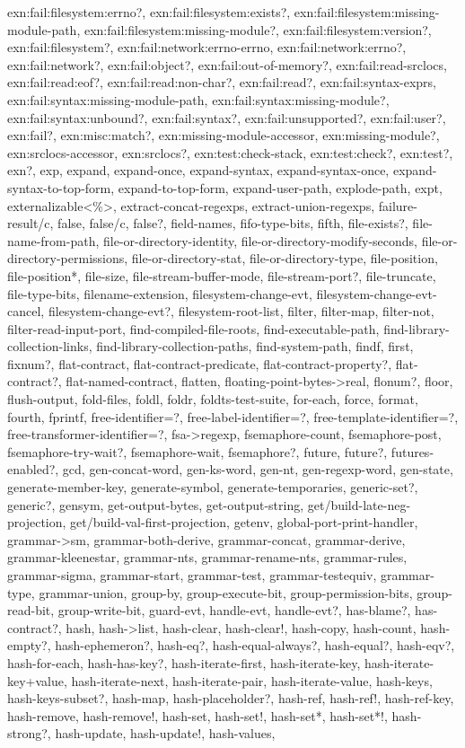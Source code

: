 {{exn:fail:filesystem:errno?, exn:fail:filesystem:exists?, exn:fail:filesystem:missing-module-path, exn:fail:filesystem:missing-module?, exn:fail:filesystem:version?, exn:fail:filesystem?, exn:fail:network:errno-errno, exn:fail:network:errno?, exn:fail:network?, exn:fail:object?, exn:fail:out-of-memory?, exn:fail:read-srclocs, exn:fail:read:eof?, exn:fail:read:non-char?, exn:fail:read?, exn:fail:syntax-exprs, exn:fail:syntax:missing-module-path, exn:fail:syntax:missing-module?, exn:fail:syntax:unbound?, exn:fail:syntax?, exn:fail:unsupported?, exn:fail:user?, exn:fail?, exn:misc:match?, exn:missing-module-accessor, exn:missing-module?, exn:srclocs-accessor, exn:srclocs?, exn:test:check-stack, exn:test:check?, exn:test?, exn?, exp, expand, expand-once, expand-syntax, expand-syntax-once, expand-syntax-to-top-form, expand-to-top-form, expand-user-path, explode-path, expt, externalizable<\%>, extract-concat-regexps, extract-union-regexps, failure-result/c, false, false/c, false?, field-names, fifo-type-bits, fifth, file-exists?, file-name-from-path, file-or-directory-identity, file-or-directory-modify-seconds, file-or-directory-permissions, file-or-directory-stat, file-or-directory-type, file-position, file-position*, file-size, file-stream-buffer-mode, file-stream-port?, file-truncate, file-type-bits, filename-extension, filesystem-change-evt, filesystem-change-evt-cancel, filesystem-change-evt?, filesystem-root-list, filter, filter-map, filter-not, filter-read-input-port, find-compiled-file-roots, find-executable-path, find-library-collection-links, find-library-collection-paths, find-system-path, findf, first, fixnum?, flat-contract, flat-contract-predicate, flat-contract-property?, flat-contract?, flat-named-contract, flatten, floating-point-bytes->real, flonum?, floor, flush-output, fold-files, foldl, foldr, foldts-test-suite, for-each, force, format, fourth, fprintf, free-identifier=?, free-label-identifier=?, free-template-identifier=?, free-transformer-identifier=?, fsa->regexp, fsemaphore-count, fsemaphore-post, fsemaphore-try-wait?, fsemaphore-wait, fsemaphore?, future, future?, futures-enabled?, gcd, gen-concat-word, gen-ks-word, gen-nt, gen-regexp-word, gen-state, generate-member-key, generate-symbol, generate-temporaries, generic-set?, generic?, gensym, get-output-bytes, get-output-string, get/build-late-neg-projection, get/build-val-first-projection, getenv, global-port-print-handler, grammar->sm, grammar-both-derive, grammar-concat, grammar-derive, grammar-kleenestar, grammar-nts, grammar-rename-nts, grammar-rules, grammar-sigma, grammar-start, grammar-test, grammar-testequiv, grammar-type, grammar-union, group-by, group-execute-bit, group-permission-bits, group-read-bit, group-write-bit, guard-evt, handle-evt, handle-evt?, has-blame?, has-contract?, hash, hash->list, hash-clear, hash-clear!, hash-copy, hash-count, hash-empty?, hash-ephemeron?, hash-eq?, hash-equal-always?, hash-equal?, hash-eqv?, hash-for-each, hash-has-key?, hash-iterate-first, hash-iterate-key, hash-iterate-key+value, hash-iterate-next, hash-iterate-pair, hash-iterate-value, hash-keys, hash-keys-subset?, hash-map, hash-placeholder?, hash-ref, hash-ref!, hash-ref-key, hash-remove, hash-remove!, hash-set, hash-set!, hash-set*, hash-set*!, hash-strong?, hash-update, hash-update!, hash-values, }}
